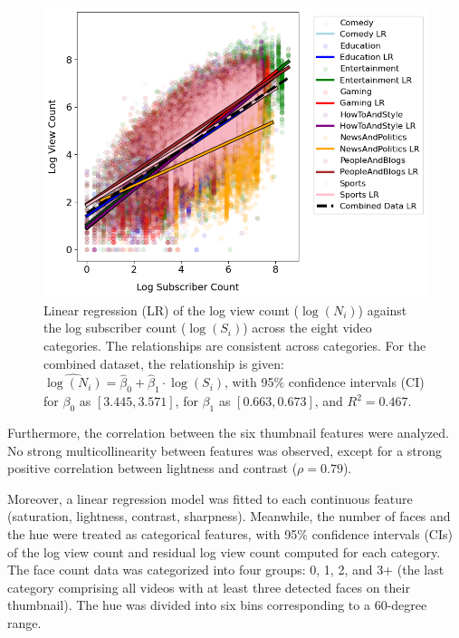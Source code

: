 \documentclass{article}
\begin{document}
\begin{figure}[h]
  \begin{minipage}[t]{0.50\textwidth}
    \vspace{0pt}  %
    \includegraphics[width=\textwidth]{figs/subscriber.png}
  \end{minipage}%
  \hspace{0.05\textwidth}%
  \begin{minipage}[t]{0.45\textwidth}
    \vspace{0pt}  %
    \caption{Linear regression (LR) of the log view count ($\log{(N_i)}$) against the log subscriber count ($\log{(S_i)}$) across the eight video categories. The relationships are consistent across categories. For the combined dataset, the relationship is given: $\widehat{\log(N_i)} = \hat{\beta}_0 + \hat{\beta}_1 \cdot \log(S_i)$, with 95\% confidence intervals (CI) for $\beta_0$ as $[3.445, 3.571]$, for $\beta_1$ as $[0.663, 0.673]$, and $R^2 = 0.467$.}
    \label{fig:subscriber}
  \end{minipage}
\end{figure}

Furthermore, the correlation between the six thumbnail features were analyzed. No strong multicollinearity between features was observed, except for a strong positive correlation between lightness and contrast ($\rho=0.79$).

Moreover, a linear regression model was fitted to each continuous feature (saturation, lightness, contrast, sharpness). Meanwhile, the number of faces and the hue were treated as categorical features, with 95\% confidence intervals (CIs) of the log view count and residual log view count computed for each category. The face count data was categorized into four groups: 0, 1, 2, and 3+ (the last category comprising all videos with at least three detected faces on their thumbnail). The hue was divided into six bins corresponding to a 60-degree range.
\end{document}
